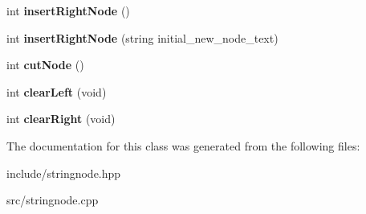 \begin{DoxyCompactItemize}
\item 
int {\bfseries insert\+Right\+Node} ()\hypertarget{classStringNode_a192e40e2be07ac57b1d14980769e31b7}{}\label{classStringNode_a192e40e2be07ac57b1d14980769e31b7}

\item 
int {\bfseries insert\+Right\+Node} (string initial\+\_\+new\+\_\+node\+\_\+text)\hypertarget{classStringNode_abf313da2479d5c40c2769474948a7398}{}\label{classStringNode_abf313da2479d5c40c2769474948a7398}

\item 
int {\bfseries cut\+Node} ()\hypertarget{classStringNode_a6806b5d28b229df7b7c195d2acad5578}{}\label{classStringNode_a6806b5d28b229df7b7c195d2acad5578}

\item 
int {\bfseries clear\+Left} (void)\hypertarget{classStringNode_a8b39a65ddafb6a3324823da77d0af6d0}{}\label{classStringNode_a8b39a65ddafb6a3324823da77d0af6d0}

\item 
int {\bfseries clear\+Right} (void)\hypertarget{classStringNode_a778c4554c12fc329fd9d3ecb54c1849b}{}\label{classStringNode_a778c4554c12fc329fd9d3ecb54c1849b}

\end{DoxyCompactItemize}


The documentation for this class was generated from the following files\+:\begin{DoxyCompactItemize}
\item 
include/stringnode.\+hpp\item 
src/stringnode.\+cpp\end{DoxyCompactItemize}
